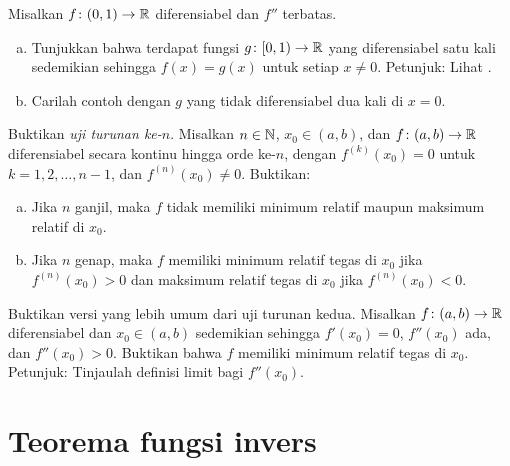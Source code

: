 \begin{exercise} \label{exercise:extendboundedder2}
Misalkan $f \colon (0,1) \to {\mathbb{R}}$ diferensiabel dan $f''$
terbatas.
\begin{enumerate}[a)]
\item
Tunjukkan bahwa terdapat fungsi $g \colon [0,1) \to {\mathbb{R}}$ yang diferensiabel satu kali
sedemikian sehingga $f(x) = g(x)$ untuk setiap $x \neq 0$.  Petunjuk: 
Lihat
.
\item
Carilah contoh dengan $g$ yang tidak diferensiabel dua kali di $x=0$.
\end{enumerate}
\end{exercise}

\begin{exercise}
Buktikan
\emph{uji turunan ke-$n$}.
Misalkan $n \in {\mathbb{N}}$,
$x_0 \in (a,b)$, dan $f \colon (a,b) \to {\mathbb{R}}$ diferensiabel secara kontinu hingga orde ke-$n$,
dengan $f^{(k)}(x_0) = 0$ untuk $k=1,2,\ldots,n-1$, dan
$f^{(n)}(x_0)
\neq 0$.
Buktikan:
\begin{enumerate}[a)]
\item
Jika $n$ ganjil, maka $f$ tidak memiliki minimum relatif
maupun maksimum relatif di $x_0$.
\item
Jika $n$ genap, maka $f$ memiliki minimum relatif tegas di $x_0$ jika
$f^{(n)}(x_0) > 0$
dan maksimum relatif tegas di $x_0$ jika $f^{(n)}(x_0) < 0$.
\end{enumerate}
\end{exercise}

\begin{exercise}
Buktikan versi yang lebih umum dari uji turunan kedua.
Misalkan $f \colon (a,b) \to {\mathbb{R}}$ diferensiabel dan $x_0 \in (a,b)$
sedemikian sehingga $f'(x_0) = 0$, $f''(x_0)$ ada, dan $f''(x_0) > 0$.
Buktikan bahwa $f$ memiliki minimum
relatif tegas di $x_0$.  Petunjuk: Tinjaulah definisi limit bagi $f''(x_0)$.
\end{exercise}


\sectionnewpage
\section{Teorema fungsi invers}
\label{sec:ift}



